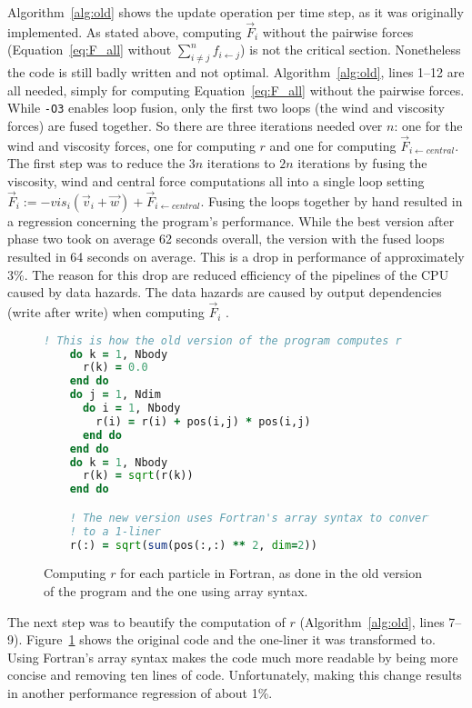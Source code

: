 \documentclass[twoside,11pt]{article}
\begin{document}
Algorithm~\ref{alg:old} shows the update operation per time step,
as it was originally implemented.
As stated above, computing $\vec{F}_i$ without the pairwise
forces (Equation~\ref{eq:F_all} without
$\sum_{i \neq j}^n f_{i \leftarrow j}$) is not the critical section.
Nonetheless the code is still badly written and not optimal.
Algorithm~\ref{alg:old}, lines 1--12 are all needed, simply for
computing Equation~\ref{eq:F_all} without the pairwise forces.
While \texttt{-O3} enables loop fusion, only the first two loops
(the wind and viscosity forces) are fused together.
So there are three iterations needed over $n$: one for the wind and
viscosity forces, one for computing $r$ and one for computing
$\vec{F}_{i \leftarrow central}$.
The first step was to reduce the $3n$ iterations to $2n$ iterations by
fusing the viscosity, wind and central force computations all into
a single loop setting $\vec{F}_i := -vis_i(\vec{v}_i + \vec{w}) +
  \vec{F}_{i \leftarrow central}$.
Fusing the loops together by hand resulted in a regression concerning
the program's performance.
While the best version after phase two took on average 62 seconds
overall, the version with the fused loops resulted in 64 seconds
on average.
This is a drop in performance of approximately 3\%.
The reason for this drop are reduced efficiency of the pipelines of
the CPU caused by data hazards.
The data hazards are caused by output dependencies (write after write)
when computing $\vec{F}_i$ \citep[see e.g.][]{patterson_2014}.

\begin{figure} %
  \begin{lstlisting}[language=Fortran]
    ! This is how the old version of the program computes r
    do k = 1, Nbody
      r(k) = 0.0
    end do
    do j = 1, Ndim
      do i = 1, Nbody
        r(i) = r(i) + pos(i,j) * pos(i,j)
      end do
    end do
    do k = 1, Nbody
      r(k) = sqrt(r(k))
    end do

    ! The new version uses Fortran's array syntax to convert this
    ! to a 1-liner
    r(:) = sqrt(sum(pos(:,:) ** 2, dim=2))

  \end{lstlisting}
  \caption{Computing $r$ for each particle in Fortran, as done in the
    old version of the program and the one using array syntax.}
  \label{fig:r}
\end{figure} %

The next step was to beautify the computation of $r$
(Algorithm~\ref{alg:old}, lines 7--9).
Figure~\ref{fig:r} shows the original code and the one-liner it
was transformed to.
Using Fortran's array syntax makes the code much more readable by
being more concise and removing ten lines of code.
Unfortunately, making this change results in another performance
regression of about 1\%.
\end{document}
